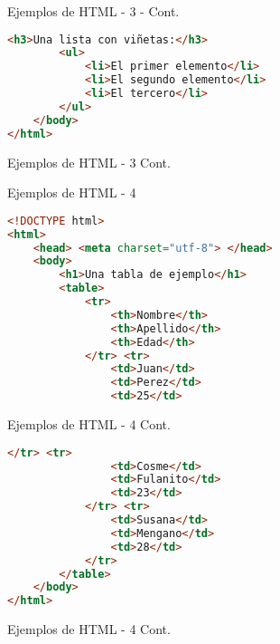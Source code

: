 
\begin{frame}[fragile]{Ejemplos de HTML - 3 - Cont.}
	\begin{lstlisting}[language=HTML]
		<h3>Una lista con viñetas:</h3>
		<ul>
			<li>El primer elemento</li>
			<li>El segundo elemento</li>
			<li>El tercero</li>
		</ul>
	</body>
</html>
	\end{lstlisting}
\end{frame}


\begin{frame}[fragile]{Ejemplos de HTML - 3 Cont.}
\end{frame}


\begin{frame}[fragile]{Ejemplos de HTML - 4}
	\begin{lstlisting}[language=HTML]
<!DOCTYPE html>
<html>
	<head> <meta charset="utf-8"> </head>
	<body>
		<h1>Una tabla de ejemplo</h1>
		<table>
			<tr>
				<th>Nombre</th>
				<th>Apellido</th>
				<th>Edad</th>
			</tr> <tr>
				<td>Juan</td>
				<td>Perez</td>
				<td>25</td>
	\end{lstlisting}
\end{frame}


\begin{frame}[fragile]{Ejemplos de HTML - 4 Cont.}
	\begin{lstlisting}[language=HTML]
			</tr> <tr>
				<td>Cosme</td>
				<td>Fulanito</td>
				<td>23</td>
			</tr> <tr>
				<td>Susana</td>
				<td>Mengano</td>
				<td>28</td>
			</tr>
		</table>
	</body>
</html>
	\end{lstlisting}
\end{frame}


\begin{frame}[fragile]{Ejemplos de HTML - 4 Cont.}
\end{frame}



